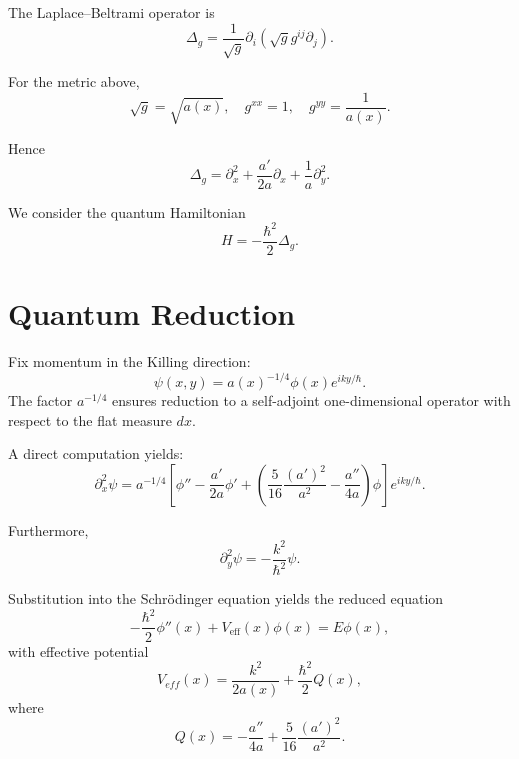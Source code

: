 \documentclass[11pt]{article}
\begin{document}
The Laplace--Beltrami operator is
\begin{equation}
\Delta_g = \frac{1}{\sqrt{g}} \partial_i \left( \sqrt{g} g^{ij} \partial_j \right).
\end{equation}

For the metric above,
\[
\sqrt{g} = \sqrt{a(x)}, \quad g^{xx} = 1, \quad g^{yy} = \frac{1}{a(x)}.
\]

Hence
\begin{equation}
\Delta_g=\partial_x^2+\frac{a'}{2a}\partial_x+\frac{1}{a}\partial_y^2.
\end{equation}

We consider the quantum Hamiltonian
\begin{equation}
H = -\frac{\hbar^2}{2}\Delta_g.
\end{equation}

\section{Quantum Reduction}

Fix momentum in the Killing direction:
\begin{equation}
\psi(x,y)=a(x)^{-1/4}\phi(x)e^{i k y/\hbar}.
\end{equation}
The factor $a^{-1/4}$ ensures reduction to a self-adjoint one-dimensional operator with respect to the flat measure $dx$.

A direct computation yields:
\begin{equation}
\partial_x^2 \psi=a^{-1/4}\left[\phi''-\frac{a'}{2a}\phi'+\left(\frac{5}{16}\frac{(a')^2}{a^2}
-\frac{a''}{4a}\right)\phi\right]e^{iky/\hbar}.
\end{equation}

Furthermore,
\begin{equation}
\partial_y^2 \psi = -\frac{k^2}{\hbar^2}\psi.
\end{equation}

Substitution into the Schr\"odinger equation yields the reduced equation
\begin{equation}
-\frac{\hbar^2}{2}\phi''(x)+V_{\mathrm{eff}}(x)\phi(x)=E\phi(x),
\end{equation}
with effective potential
\begin{equation}
    V_{eff}(x)=\frac{k^2}{2a(x)}+\frac{\hbar^2}{2} Q(x),
\end{equation}
where
\begin{equation}
    Q(x)= -\frac{a''}{4a}+\frac{5}{16}\frac{(a')^2}{a^2}.
\end{equation}
\end{document}
